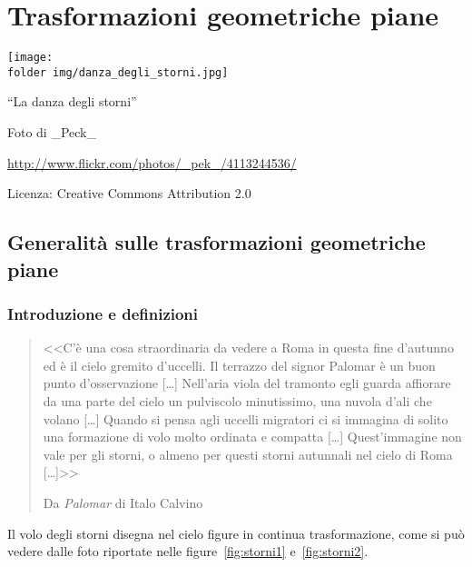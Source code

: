 
\chapter{Trasformazioni geometriche piane}\label{chap:trasformazioni}

\texttt{[image: \\folder img/danza\_degli\_storni.jpg]}
  \begin{center}
    {\large ``La danza degli storni''}\par
    Foto di \_Peck\_\par
    \url{http://www.flickr.com/photos/_pek_/4113244536/}\par
    Licenza: Creative Commons Attribution 2.0\par
  \end{center}
\newpage


\section{Generalità sulle trasformazioni geometriche 
piane}\label{sect:generalita_trasformazioni}

\subsection{Introduzione e definizioni}

\begin{quote}
<<C'è una cosa straordinaria da vedere a Roma in questa fine 
d'autunno ed è il cielo gremito d'uccelli. Il terrazzo del signor 
Palomar è un buon punto d'osservazione [\ldots{}] Nell'aria viola del 
tramonto egli guarda affiorare da una parte del cielo un pulviscolo 
minutissimo, una nuvola d'ali che volano [\ldots{}] Quando si pensa 
agli uccelli migratori ci si immagina di solito una formazione di volo 
molto ordinata e compatta [\ldots{}] Quest'immagine non vale per gli 
storni, o almeno per questi storni autunnali nel cielo di Roma 
[\ldots{}]>>

\hfill{}Da \emph{Palomar} di Italo Calvino
\end{quote}

Il volo degli storni disegna nel cielo figure in continua 
trasformazione, come si può vedere dalle foto riportate nelle 
figure~\ref{fig:storni1} e~\ref{fig:storni2}.

